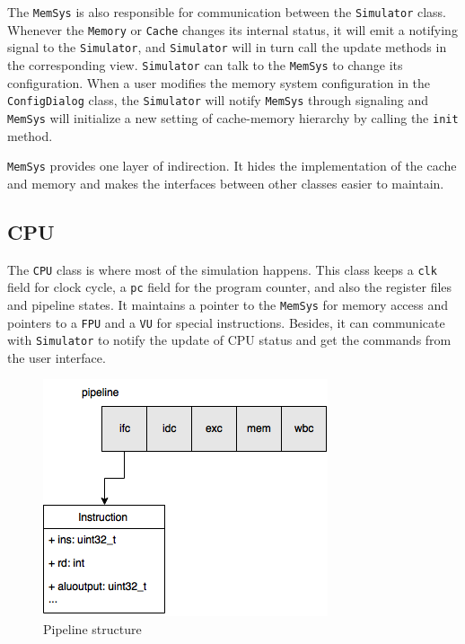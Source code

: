 \documentclass{sig-alternate}
\begin{document}
The \texttt{MemSys} is also responsible for communication between the \texttt{Simulator} class. Whenever the \texttt{Memory} or \texttt{Cache} changes its internal status, it will emit a notifying signal to the \texttt{Simulator}, and \texttt{Simulator} will in turn call the update methods in the corresponding view. \texttt{Simulator} can talk to the \texttt{MemSys} to change its configuration. When a user modifies the memory system configuration in the \texttt{ConfigDialog} class, the \texttt{Simulator} will notify \texttt{MemSys} through signaling and \texttt{MemSys} will initialize a new setting of cache-memory hierarchy by calling the \texttt{init} method.

\texttt{MemSys} provides one layer of indirection. It hides the implementation of the cache and memory and makes the interfaces between other classes easier to maintain. 

\subsection{CPU}
The \texttt{CPU} class is where most of the simulation happens. This class keeps a \texttt{clk} field for clock cycle, a \texttt{pc} field for the program counter, and also the register files and pipeline states. It maintains a pointer to the \texttt{MemSys} for memory access and pointers to a \texttt{FPU} and a \texttt{VU} for special instructions. Besides, it can communicate with \texttt{Simulator} to notify the update of CPU status and get the commands from the user interface.
\begin{figure}[!ht]
\centering
\includegraphics[width = 0.7\linewidth,keepaspectratio]{pipeline}
\caption{Pipeline structure}
\label{fig:pip}
\end{figure}
\end{document}
